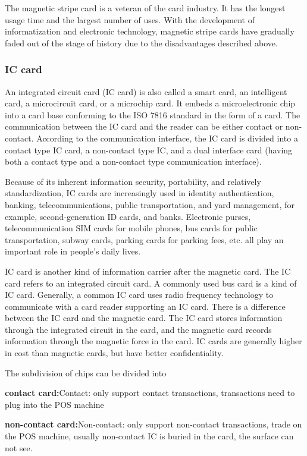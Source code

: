 \documentclass[journal]{IEEEtran}
\begin{document}
The magnetic stripe card is a veteran of the card industry. It has the longest usage time and the largest number of uses. With the development of informatization and electronic technology, magnetic stripe cards have gradually faded out of the stage of history due to the disadvantages described above.

\subsubsection{IC card}
An integrated circuit card (IC card) is also called a smart card, an intelligent card, a microcircuit card, or a microchip card. It embeds a microelectronic chip into a card base conforming to the ISO 7816 standard in the form of a card. The communication between the IC card and the reader can be either contact or non-contact. According to the communication interface, the IC card is divided into a contact type IC card, a non-contact type IC, and a dual interface card (having both a contact type and a non-contact type communication interface).

Because of its inherent information security, portability, and relatively standardization, IC cards are increasingly used in identity authentication, banking, telecommunications, public transportation, and yard management, for example, second-generation ID cards, and banks. Electronic purses, telecommunication SIM cards for mobile phones, bus cards for public transportation, subway cards, parking cards for parking fees, etc. all play an important role in people's daily lives.

IC card is another kind of information carrier after the magnetic card. The IC card refers to an integrated circuit card. A commonly used bus card is a kind of IC card. Generally, a common IC card uses radio frequency technology to communicate with a card reader supporting an IC card. There is a difference between the IC card and the magnetic card. The IC card stores information through the integrated circuit in the card, and the magnetic card records information through the magnetic force in the card. IC cards are generally higher in cost than magnetic cards, but have better confidentiality.

The subdivision of chips can be divided into 

\textbf{contact card:}Contact: only support contact transactions, transactions need to plug into the POS machine

\textbf{non-contact card:}Non-contact: only support non-contact transactions, trade on the POS machine, usually non-contact IC is buried in the card, the surface can not see.
\end{document}
